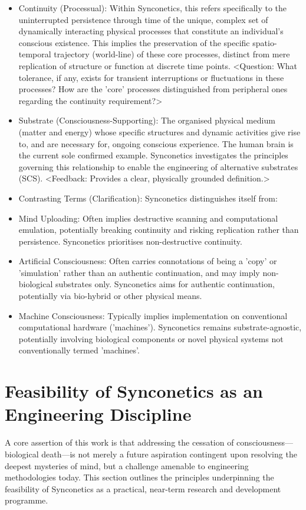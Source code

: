 \documentclass[10pt]{article}
\begin{document}
\begin{sloppypar}
\begin{itemize}
    \item Continuity (Processual): Within Synconetics, this refers specifically to the uninterrupted persistence through time of the unique, complex set of dynamically interacting physical processes that constitute an individual's conscious existence. This implies the preservation of the specific spatio-temporal trajectory (world-line) of these core processes, distinct from mere replication of structure or function at discrete time points. <Question: What tolerance, if any, exists for transient interruptions or fluctuations in these processes? How are the 'core' processes distinguished from peripheral ones regarding the continuity requirement?>
    \item Substrate (Consciousness-Supporting): The organised physical medium (matter and energy) whose specific structures and dynamic activities give rise to, and are necessary for, ongoing conscious experience. The human brain is the current sole confirmed example. Synconetics investigates the principles governing this relationship to enable the engineering of alternative substrates (SCS). <Feedback: Provides a clear, physically grounded definition.>
    \item Contrasting Terms (Clarification): Synconetics distinguishes itself from:
    \item Mind Uploading: Often implies destructive scanning and computational emulation, potentially breaking continuity and risking replication rather than persistence. Synconetics prioritises non-destructive continuity.
    \item Artificial Consciousness: Often carries connotations of being a 'copy' or 'simulation' rather than an authentic continuation, and may imply non-biological substrates only. Synconetics aims for authentic continuation, potentially via bio-hybrid or other physical means.
    \item Machine Consciousness: Typically implies implementation on conventional computational hardware ('machines'). Synconetics remains substrate-agnostic, potentially involving biological components or novel physical systems not conventionally termed 'machines'.
  \end{itemize}

  \section{Feasibility of Synconetics as an Engineering Discipline}
  \label{sec:feasibility}

  A core assertion of this work is that addressing the cessation of consciousness—biological death—is not merely a future aspiration contingent upon resolving the deepest mysteries of mind, but a challenge amenable to engineering methodologies today. This section outlines the principles underpinning the feasibility of Synconetics as a practical, near-term research and development programme.


\end{sloppypar}
\end{document}
